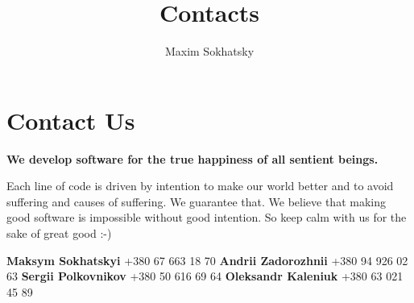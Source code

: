 \documentclass[11pt]{article}
\begin{document}
\title{Contacts}
\author{Maxim Sokhatsky}


\section*{Contact Us}

\textbf{We develop software for the true happiness of all sentient beings.}

Each line of code is driven by intention to make our world better and to
avoid suffering and causes of suffering. We guarantee that.
We believe that making good software is impossible without good intention.
So keep calm with us for the sake of great good :-)


\textbf{Maksym Sokhatskyi}  +380 67 663 18 70 \@br
\textbf{Andrii Zadorozhnii}  +380 94 926 02 63 \@br
\textbf{Sergii Polkovnikov}  +380 50 616 69 64 \@br
\textbf{Oleksandr Kaleniuk}  +380 63 021 45 89 \@br

\end{document}
